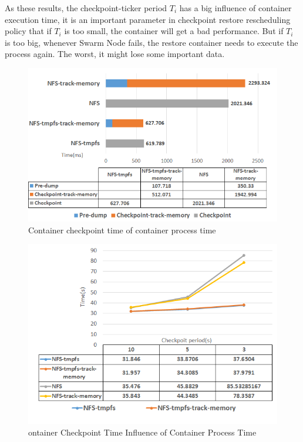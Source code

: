 As these results, the checkpoint-ticker period $ T_i $ has a big influence of container execution time, it is an important parameter in checkpoint restore rescheduling policy that if $ T_i $ is too small, the container will get a bad performance. But if $ T_i $ is too big, whenever Swarm Node fails, the restore container needs to execute the process again. The worst, it might lose some important data.

\begin{figure}[h]
\begin{center}
\includegraphics[width=14cm]{figure/cpu_checkpoint_time.png}
\end{center}
\caption{Container checkpoint time of container process time}
\label{fig:Checkpoint Time CPU}
\end{figure}

\begin{figure}[h]
\begin{center}
\includegraphics[width=14cm]{figure/cpu_checkpoint_period.png}
\end{center}
\caption{ontainer Checkpoint Time Influence of Container Process Time}
\label{fig:Checkpoint Time Influence CPU}
\end{figure}

